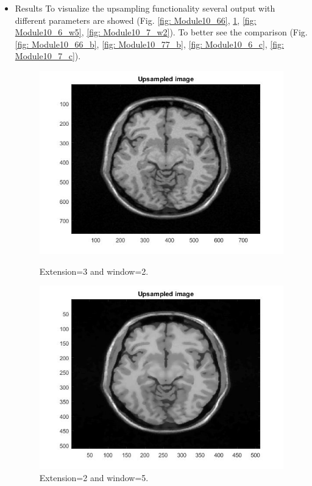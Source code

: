 \begin{itemize}
\item Results
\newline To visualize the upsampling functionality several output with different parameters are showed (Fig. \ref{fig: Module10_66}, \ref{fig: Module10_77}, \ref{fig: Module10_6_w5}, \ref{fig: Module10_7_w2}). To better see the comparison (Fig.\ref{fig: Module10_66_b}, \ref{fig: Module10_77_b}, \ref{fig: Module10_6_c}, \ref{fig: Module10_7_c}).

\begin{figure}[H]
\centering
\begin{minipage}{.5\textwidth}
  \centering
  \includegraphics[width=.7\linewidth]{figures/Module_10/Module10_6}
 \caption{Extension=3 and window=2.}
  \label{fig: Module10_66}
\end{minipage}%
\begin{minipage}{.5\textwidth}
  \centering
  \includegraphics[width=.7\linewidth]{figures/Module_10/Module10_7}
 \caption{Extension=2 and window=5.}
  \label{fig: Module10_77}
\end{minipage}


\end{figure}
\end{itemize}
